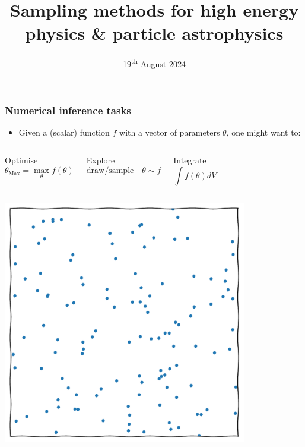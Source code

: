 \documentclass[aspectratio=169]{beamer}
\title{Sampling methods for high energy physics \& particle astrophysics}
\date{19\textsuperscript{th} August 2024}
\begin{document}
\begin{frame}
    \titlepage
\end{frame}

%

\begin{frame}
    \frametitle{Numerical inference tasks}
    \begin{itemize}
        \item Given a (scalar) function $f$ with a vector of parameters $\theta$, one might want to:
    \end{itemize}
    \vspace{-10pt}
    \begin{columns}[t]
        \begin{block}{Optimise}
            \[\theta_\text{Max} = \max_\theta{f(\theta)}\]
        \end{block}
        \begin{block}{Explore}
            \vspace{-10pt}
            \[\text{draw/sample}\quad \theta\sim f\]
            \vspace{-15pt}
        \end{block}
        \begin{block}{Integrate}
            \[\int f(\theta) dV \]
        \end{block}
    \end{columns}
    \begin{columns}[t]
        \centerline{\includegraphics[width=0.8\textwidth,page=13]{figures/himmelblau}}

\end{columns}
\end{frame}
\end{document}
